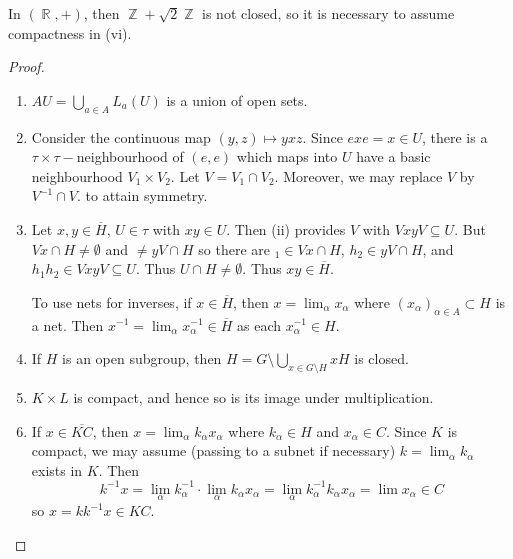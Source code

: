 \documentclass[11pt, a4paper]{memoir}
\DeclareMathOperator{\Z}{{\mathbb{Z}}}
\DeclareMathOperator{\R}{{\mathbb{R}}}
\newcommand{\ol}[1]{\ensuremath{\overline{#1}}}
\theoremstyle{change}
\theoremstyle{plain}
\theoremstyle{nonumberplain}
\newtheorem{proof}{Proof}
\numberwithin{equation}{section}
\begin{document}
In $(\R,+)$, then $\Z+\sqrt{2}\Z$ is not closed, so it is necessary to assume compactness in (vi).
\begin{proof}
    \begin{enumerate}[nl,r]
        \item $AU=\bigcup_{a\in A}L_a(U)$ is a union of open sets.
        \item Consider the continuous map $(y,z)\mapsto yxz$.
            Since $exe=x\in U$, there is a $\tau\times\tau-$neighbourhood of $(e,e)$ which maps into $U$ have a basic neighbourhood $V_1\times V_2$.
            Let $V=V_1\cap V_2$.
            Moreover, we may replace $V$ by $V^{-1}\cap V$. to attain symmetry.
        \item Let $x,y\in\ol{H}$, $U\in\tau$ with $xy\in U$.
            Then (ii) provides $V$ with $VxyV\subseteq U$.
            But $Vx\cap H\neq\emptyset$ and $\neq yV\cap H$ so there are $_1\in Vx\cap H$, $h_2\in yV\cap H$, and $h_1h_2\in VxyV\subseteq U$.
            Thus $U\cap H\neq\emptyset$.
            Thus $xy\in\ol{H}$.

            To use nets for inverses, if $x\in\ol{H}$, then $x=\lim_\alpha x_\alpha$ where $(x_\alpha)_{\alpha\in A}\subset H$ is a net.
            Then $x^{-1}=\lim_\alpha x_\alpha^{-1}\in\ol{H}$ as each $x_\alpha^{-1}\in H$.
        \item If $H$ is an open subgroup, then $H=G\setminus\bigcup_{x\in G\setminus H}xH$ is closed.
        \item $K\times L$ is compact, and hence so is its image under multiplication.
        \item If $x\in\ol{KC}$, then $x=\lim_\alpha k_\alpha x_\alpha$ where $k_\alpha\in H$ and $x_\alpha\in C$.
            Since $K$ is compact, we may assume (passing to a subnet if necessary) $k=\lim_\alpha k_\alpha$ exists in $K$.
            Then
            \begin{equation*}
                k^{-1}x=\lim_\alpha k_\alpha^{-1}\cdot\lim_\alpha k_\alpha x_\alpha=\lim_\alpha k_\alpha^{-1}k_\alpha x_\alpha=\lim x_\alpha\in C
            \end{equation*}
            so $x=kk^{-1}x\in KC$.
    \end{enumerate}
\end{proof}
\end{document}
